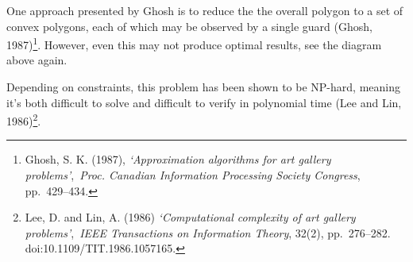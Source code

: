 \documentclass[
]{article}
\begin{document}
One approach presented by Ghosh is to reduce the the overall polygon to
a set of convex polygons, each of which may be observed by a single
guard (Ghosh, 1987)\footnote{Ghosh, S. K. (1987), \emph{`Approximation
  algorithms for art gallery problems'},~\emph{Proc. Canadian
  Information Processing Society Congress}, pp.~429--434.}. However,
even this may not produce optimal results, see the diagram above again.

Depending on constraints, this problem has been shown to be NP-hard,
meaning it's both difficult to solve and difficult to verify in
polynomial time (Lee and Lin, 1986)\footnote{Lee, D. and Lin, A. (1986)
  \emph{`Computational complexity of art gallery problems'},~\emph{IEEE
  Transactions on Information Theory}, 32(2), pp.~276--282.
  doi:10.1109/TIT.1986.1057165.}.
\end{document}
